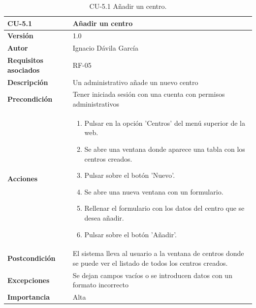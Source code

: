 \begin{table}[p]
	\centering
	\begin{tabularx}{\linewidth}{ p{} p{} }
		\toprule
		\textbf{CU-5.1}    & \textbf{Añadir un centro}\\
		\toprule
		\textbf{Versión}              & 1.0    \\
		\textbf{Autor}                & Ignacio Dávila García \\
		\textbf{Requisitos asociados} & RF-05 \\
		\textbf{Descripción}          & Un administrativo añade un nuevo centro \\
		\textbf{Precondición}         & Tener iniciada sesión con una cuenta con permisos administrativos \\
		\textbf{Acciones}             &
		\begin{enumerate}
			\def\labelenumi{\arabic{enumi}.}
			\tightlist
			\item Pulsar en la opción 'Centros' del menú superior de la web.
			\item Se abre una ventana donde aparece una tabla con los centros creados.
			\item Pulsar sobre el botón 'Nuevo'.
			\item Se abre una nueva ventana con un formulario.
			\item Rellenar el formulario con los datos del centro que se desea añadir.
			\item Pulsar sobre el botón 'Añadir'.
		\end{enumerate}\\
		\textbf{Postcondición}        & El sistema lleva al usuario a la ventana de centros donde se puede ver el listado de todos los centros creados. \\
		\textbf{Excepciones}          & Se dejan campos vacíos o se introducen datos con un formato incorrecto \\
		\textbf{Importancia}          & Alta \\
		\bottomrule
	\end{tabularx}
	\caption{CU-5.1 Añadir un centro.}
\end{table}


